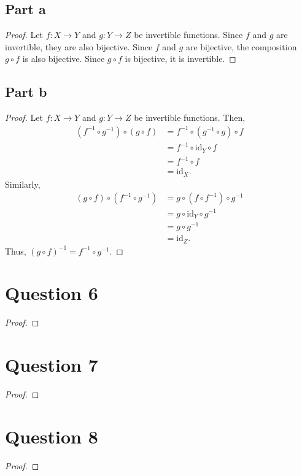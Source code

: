 \documentclass{article}
\begin{document}
\subsection*{Part a}
\begin{proof}
    Let $f: X \to Y$ and $g: Y \to Z$ be invertible functions.
    Since $f$ and $g$ are invertible, they are also bijective.
    Since $f$ and $g$ are bijective, the composition $g \circ f$ is also bijective.
    Since $g \circ f$ is bijective, it is invertible.
\end{proof}

\subsection*{Part b}
\begin{proof}
    Let $f: X \to Y$ and $g: Y \to Z$ be invertible functions.
    Then,
    \begin{align*}
        (f^{-1} \circ g^{-1}) \circ (g \circ f) &= f^{-1} \circ (g^{-1} \circ g) \circ f \\
        &= f^{-1} \circ \text{id}_Y \circ f \\
        &= f^{-1} \circ f \\
        &= \text{id}_X.
    \end{align*}
    Similarly,
    \begin{align*}
        (g \circ f) \circ (f^{-1} \circ g^{-1}) &= g \circ (f \circ f^{-1}) \circ g^{-1} \\
        &= g \circ \text{id}_Y \circ g^{-1} \\
        &= g \circ g^{-1} \\
        &= \text{id}_Z.
    \end{align*}
    Thus, $(g \circ f)^{-1} = f^{-1} \circ g^{-1}$.
\end{proof}

\section*{Question 6}
\begin{proof}

\end{proof}

\section*{Question 7}
\begin{proof}

\end{proof}

\section*{Question 8}
\begin{proof}

\end{proof}
\end{document}
